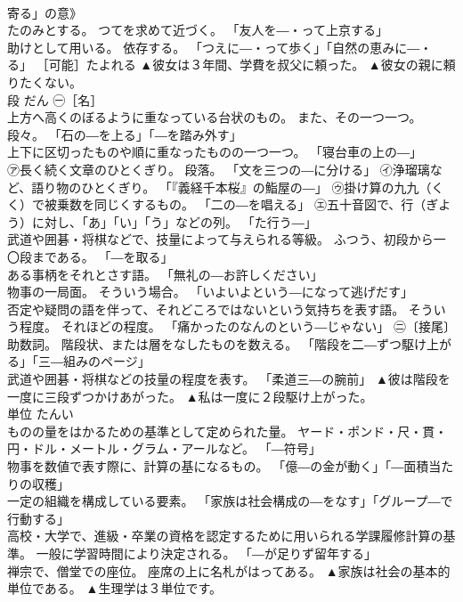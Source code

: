 \documentclass[8pt]{extreport}
\begin{document}
\begin{CJK}{UTF8}{min}
\\	寄る」の意》 
\\	たのみとする。 つてを求めて近づく。 「友人を―・って上京する」 
\\	助けとして用いる。 依存する。 「つえに―・って歩く」「自然の恵みに―・る」 ［可能］たよれる	▲彼女は３年間、学費を叔父に頼った。 ▲彼女の親に頼りたくない。
\\	段	だん	㊀［名］ 
\\	上方へ高くのぼるように重なっている台状のもの。 また、その一つ一つ。 段々。 「石の―を上る」「―を踏み外す」 
\\	上下に区切ったものや順に重なったものの一つ一つ。 「寝台車の上の―」 
\\	㋐長く続く文章のひとくぎり。 段落。 「文を三つの―に分ける」 ㋑浄瑠璃など、語り物のひとくぎり。 「『義経千本桜』の鮨屋の―」 ㋒掛け算の九九（くく）で被乗数を同じくするもの。 「二の―を唱える」 ㋓五十音図で、行（ぎよう）に対し、「あ」「い」「う」などの列。 「た行う―」 
\\	武道や囲碁・将棋などで、技量によって与えられる等級。 ふつう、初段から一〇段まである。 「―を取る」 
\\	ある事柄をそれとさす語。 「無礼の―お許しください」 
\\	物事の一局面。 そういう場合。 「いよいよという―になって逃げだす」 
\\	否定や疑問の語を伴って、それどころではないという気持ちを表す語。 そういう程度。 それほどの程度。 「痛かったのなんのという―じゃない」 ㊁〔接尾〕 
\\	助数詞。 階段状、または層をなしたものを数える。 「階段を二―ずつ駆け上がる」「三―組みのページ」 
\\	武道や囲碁・将棋などの技量の程度を表す。 「柔道三―の腕前」	▲彼は階段を一度に三段ずつかけあがった。 ▲私は一度に２段駆け上がった。
\\	単位	たんい	
\\	ものの量をはかるための基準として定められた量。 ヤード・ポンド・尺・貫・円・ドル・メートル・グラム・アールなど。 「―符号」 
\\	物事を数値で表す際に、計算の基になるもの。 「億―の金が動く」「―面積当たりの収穫」 
\\	一定の組織を構成している要素。 「家族は社会構成の―をなす」「グループ―で行動する」 
\\	高校・大学で、進級・卒業の資格を認定するために用いられる学課履修計算の基準。 一般に学習時間により決定される。 「―が足りず留年する」 
\\	禅宗で、僧堂での座位。 座席の上に名札がはってある。	▲家族は社会の基本的単位である。 ▲生理学は３単位です。

\end{CJK}
\end{document}
